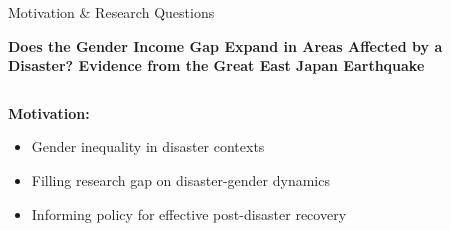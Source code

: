 \documentclass[serif, aspectratio=169]{beamer}
\begin{document}
\begin{frame}{Motivation \& Research Questions}
    \begin{center}
\vspace{-0.50cm} 







        \Large\textbf{Does the Gender Income Gap Expand in Areas Affected by a Disaster? Evidence from the Great East Japan Earthquake}
        \vspace{-0.3cm}
    \end{center}
    
    \vspace{0.7cm}
    
    \begin{columns}[T]
        \begin{column}{0.5\textwidth}
            \textbf{Motivation:}
            \begin{itemize}\small
                \item Gender inequality in disaster contexts
                \item Filling research gap on disaster-gender dynamics
                \item Informing policy for effective post-disaster recovery
            \end{itemize}
        \end{column}
        

\end{columns}
\end{frame}
\end{document}
